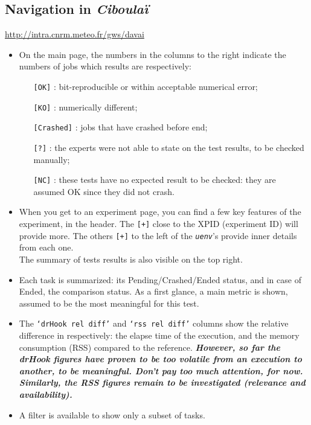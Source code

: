 \documentclass[a4paper,10pt,twoside]{article}
\begin{document}
 
 
\newpage
\subsection{Navigation in \textit{Ciboulaï}\label{sect:ciboulai_navigation}}
\href{http://intra.cnrm.meteo.fr/gws/davai}{http://intra.cnrm.meteo.fr/gws/davai}
\begin{itemize}
 \item On the main page, the numbers in the columns to the right indicate the numbers of jobs which results are respectively:
 \begin{itemize}
  \item[\texttt{[OK]}] : bit-reproducible or within acceptable numerical error;
  \item[\texttt{[KO]}] : numerically different;
  \item[\texttt{[Crashed]}] : jobs that have crashed before end;
  \item[\texttt{[?]}] : the experts were not able to state on the test results, to be checked manually;
  \item[\texttt{[NC]}] : these tests have no expected result to be checked: they are assumed OK since they did not crash.
 \end{itemize}
 \item When you get to an experiment page, you can find a few key features of the experiment, in the header. The \texttt{[+]} close to the XPID (experiment ID) will provide more. The others \texttt{[+]} to the left of the \textit{\texttt{uenv}}'s provide inner details from each one.\\
 The summary of tests results is also visible on the top right.
 \item Each task is summarized: its Pending/Crashed/Ended status, and in case of Ended, the comparison status. As a first glance, a main metric is shown, assumed to be the most meaningful for this test.
 \item The \texttt{`drHook rel diff'} and \texttt{`rss rel diff'} columns show the relative difference in respectively: the elapse time of the execution, and the memory consumption (RSS) compared to the reference. \textit{\textbf{However, so far the drHook figures have proven to be too volatile from an execution to another, to be meaningful. Don't pay too much attention, for now. Similarly, the RSS figures remain to be investigated (relevance and availability).}}
 \item A filter is available to show only a subset of tasks.

\end{itemize}
\end{document}
